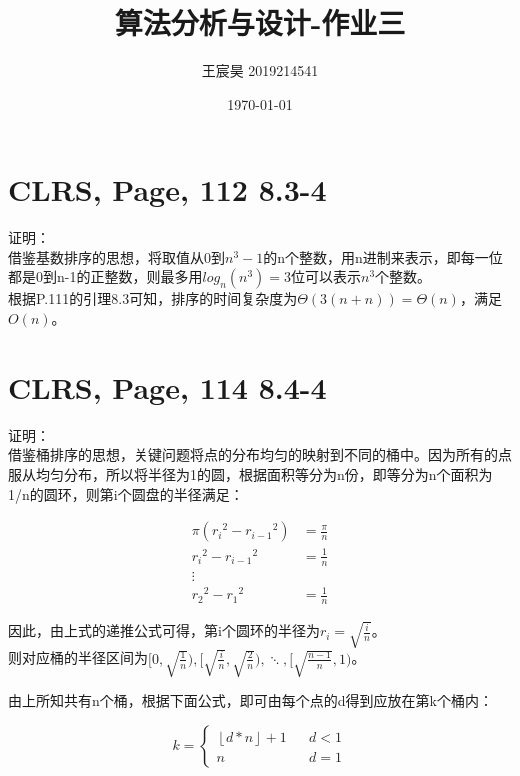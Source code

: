 \documentclass[UTF8]{ctexart}
\title{算法分析与设计-作业三}
\author{王宸昊 2019214541}
\date{\today}
\begin{document}
\maketitle


\section{CLRS, Page, 112 8.3-4}

证明： \\
借鉴基数排序的思想，将取值从0到$n^3-1$的n个整数，用n进制来表示，即每一位都是0到n-1的正整数，则最多用$log_n(n^3)=3$位可以表示$n^3$个整数。\\
根据P.111的引理8.3可知，排序的时间复杂度为$\varTheta(3(n+n)) = \varTheta(n)$，满足$O(n)$。


\section{CLRS, Page, 114 8.4-4}

证明：\\
借鉴桶排序的思想，关键问题将点的分布均匀的映射到不同的桶中。因为所有的点服从均匀分布，所以将半径为1的圆，根据面积等分为n份，即等分为n个面积为1/n的圆环，则第i个圆盘的半径满足：

\begin{align*}
    \pi({r_i}^2-{r_{i-1}}^2) &= \frac{\pi}{n} \\
    {r_i}^2-{r_{i-1}}^2 &= \frac{1}{n}\\
    \vdots\\
    {r_2}^2-{r_{1}}^2 &= \frac{1}{n}
\end{align*}

因此，由上式的递推公式可得，第i个圆环的半径为$r_i=\sqrt{\frac{i}{n}}$。\\
则对应桶的半径区间为$[0,\sqrt{\frac{1}{n}}), [\sqrt{\frac{i}{n}}, \sqrt{\frac{2}{n}}), \ddots, [\sqrt{\frac{n-1}{n}}, 1) $。

由上所知共有n个桶，根据下面公式，即可由每个点的d得到应放在第k个桶内：

\begin{equation*}
    k=\left\{
    \begin{array}{rcl}
    \left\lfloor d * n\right\rfloor + 1 & & {d < 1}\\
    n & & {d = 1}
    \end{array} \right.
\end{equation*}
  
\end{document}

